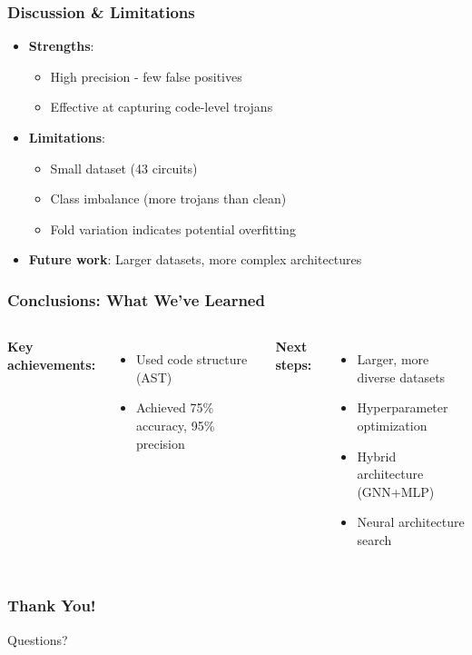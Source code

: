 \documentclass[aspectratio=169]{beamer}
\begin{document}
\begin{frame}
\frametitle{Discussion \& Limitations}
\begin{itemize}
    \item \textbf{Strengths}:
    \begin{itemize}
        \item High precision - few false positives
        \item Effective at capturing code-level trojans
    \end{itemize}
    \item \textbf{Limitations}:
    \begin{itemize}
        \item Small dataset (43 circuits)
        \item Class imbalance (more trojans than clean)
        \item Fold variation indicates potential overfitting
    \end{itemize}
    \item \textbf{Future work}: Larger datasets, more complex architectures
\end{itemize}
\end{frame}

\begin{frame}
\frametitle{Conclusions: What We've Learned}

\begin{columns}
\textbf{Key achievements:}
\begin{itemize}
    \item Used code structure (AST) 
    \item Achieved 75\% accuracy, 95\% precision
\end{itemize}



\textbf{Next steps:}
\begin{itemize}
    \item Larger, more diverse datasets
    \item Hyperparameter optimization 
    \item Hybrid architecture (GNN+MLP)
    \item Neural architecture search
    

\end{itemize}
\end{columns}
\end{frame}

\begin{frame}
\frametitle{Thank You!}
\begin{center}
\Huge Questions?
\end{center}
\end{frame}
\end{document}
